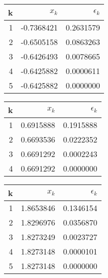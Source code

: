 \documentclass[]{article}
\begin{document}
\begin{tabular}[t]{ |r|r r| }
\hline
k & $x_k$ & $\epsilon_k$\\
\hline
1 & -0.7368421 & 0.2631579 \\
2 & -0.6505158 & 0.0863263 \\
3 & -0.6426493 & 0.0078665 \\
4 & -0.6425882 & 0.0000611 \\
5 & -0.6425882 & 0.0000000 \\
\hline
\end{tabular}
\begin{tabular}[t]{ |r|r r| }
\hline
k & $x_k$ & $\epsilon_k$\\
\hline
1 & 0.6915888 & 0.1915888 \\
2 & 0.6693536 & 0.0222352 \\
3 & 0.6691292 & 0.0002243 \\
4 & 0.6691292 & 0.0000000 \\
\hline
\end{tabular}
\begin{tabular}[t]{ |r|r r| }
\hline
k & $x_k$ & $\epsilon_k$\\
\hline
1 & 1.8653846 & 0.1346154 \\
2 & 1.8296976 & 0.0356870 \\
3 & 1.8273249 & 0.0023727 \\
4 & 1.8273148 & 0.0000101 \\
5 & 1.8273148 & 0.0000000 \\
\hline
\end{tabular}
\end{document}
